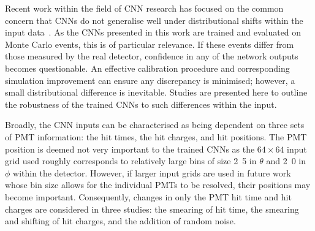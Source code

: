 Recent work within the field of CNN research has focused on the common concern that CNNs do not
generalise well under distributional shifts within the input data~\cite{djolonga2020}. As the CNNs
presented in this work are trained and evaluated on Monte Carlo events, this is of particular
relevance. If these events differ from those measured by the real \chipsfive detector, confidence
in any of the network outputs becomes questionable. An effective calibration procedure and
corresponding simulation improvement can ensure any discrepancy is minimised; however, a small
distributional difference is inevitable. Studies are presented here to outline the robustness of
the trained CNNs to such differences within the input.

Broadly, the CNN inputs can be characterised as being dependent on three sets of PMT information:
the hit times, the hit charges, and hit positions. The PMT position is deemed not very important
to the trained CNNs as the $64 \times 64$ input grid used roughly corresponds to relatively large
bins of size \unit{2.5}{} in $\theta$ and \unit{2.0}{} in $\phi$ within the
\chipsfive detector. However, if larger input grids are used in future work whose bin size allows
for the individual PMTs to be resolved, their positions may become important. Consequently,
changes in only the PMT hit time and hit charges are considered in three studies: the smearing of
hit time, the smearing and shifting of hit charges, and the addition of random noise.


